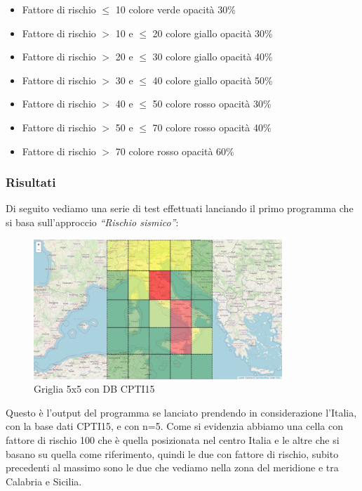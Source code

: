 \begin{itemize}
\item Fattore di rischio $\le$ 10 colore verde opacit\`a 30\%
\item Fattore di rischio $>$ 10 e $\le$ 20 colore giallo opacit\`a 30\%
\item Fattore di rischio $>$ 20 e $\le$ 30 colore giallo opacit\`a 40\%
\item Fattore di rischio $>$ 30 e $\le$ 40 colore giallo opacit\`a 50\%
\item Fattore di rischio $>$ 40 e $\le$ 50 colore rosso opacit\`a 30\%
\item Fattore di rischio $>$ 50 e $\le$ 70 colore rosso opacit\`a 40\%
\item Fattore di rischio $>$ 70 colore rosso opacit\`a 60\%
\end{itemize}

\subsubsection{Risultati}

Di seguito vediamo una serie di test effettuati lanciando il primo programma che si basa sull'approccio \textit{``Rischio sismico''}:

\begin{figure}[H]
   \centering
   \includegraphics[width=0.835\textwidth]{images/5x5_CPTI15.jpg}
   \caption{Griglia 5x5 con DB CPTI15}
\end{figure}

Questo \`e l'output del programma se lanciato prendendo in considerazione l'Italia, con la base dati CPTI15, e con n=5. Come si evidenzia abbiamo una cella con fattore di rischio 100 che \`e quella posizionata nel centro Italia e le altre che si basano su quella come riferimento, quindi le due con fattore di rischio, subito precedenti al massimo sono le due che vediamo nella zona del meridione e tra Calabria e Sicilia.

